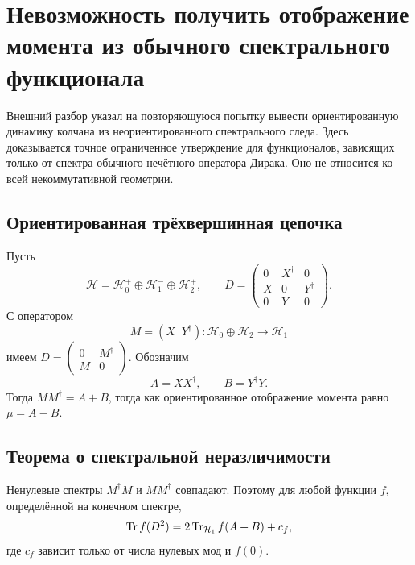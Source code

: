 \chapter{Невозможность получить отображение момента из обычного спектрального функционала}

Внешний разбор указал на повторяющуюся попытку вывести ориентированную
динамику колчана из неориентированного спектрального следа. Здесь доказывается
точное ограниченное утверждение для функционалов, зависящих только от спектра
обычного нечётного оператора Дирака. Оно не относится ко всей
некоммутативной геометрии.

\section{Ориентированная трёхвершинная цепочка}

Пусть
\begin{equation}
 \mathcal H=\mathcal H_0^+\oplus\mathcal H_1^-\oplus\mathcal H_2^+,
 \qquad
 D=\begin{pmatrix}0&X^\dagger&0\\X&0&Y^\dagger\\0&Y&0\end{pmatrix}.
 \label{eq:v5-three-node-dirac}
\end{equation}
С оператором
\begin{equation}
 M=(X\;\;Y^\dagger):\mathcal H_0\oplus\mathcal H_2\to\mathcal H_1
\end{equation}
имеем \(D=\left(\begin{smallmatrix}0&M^\dagger\\M&0\end{smallmatrix}\right)\).
Обозначим
\begin{equation}
 A=XX^\dagger,\qquad B=Y^\dagger Y.
\end{equation}
Тогда \(MM^\dagger=A+B\), тогда как ориентированное отображение момента
равно \(\mu=A-B\).

\section{Теорема о спектральной неразличимости}

Ненулевые спектры \(M^\dagger M\) и \(MM^\dagger\) совпадают. Поэтому для
любой функции \(f\), определённой на конечном спектре,
\begin{equation}
 \operatorname{Tr} f(D^2)=2\operatorname{Tr}_{\mathcal H_1}f(A+B)+c_f,
 \label{eq:v5-general-spectral-functional}
\end{equation}
где \(c_f\) зависит только от числа нулевых мод и \(f(0)\).

